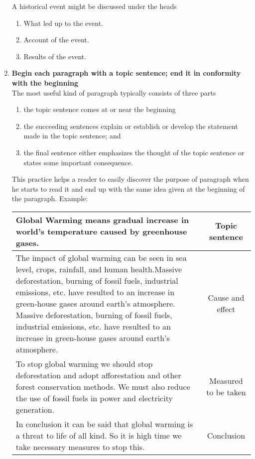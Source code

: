 \documentclass{report}
\begin{document}
\begin{enumerate}
	A historical event might be discussed under the heads
	\begin{enumerate}
		\item What led up to the event.
		\item Account of the event.
		\item Results of the event.
	\end{enumerate}
	
	\item \textbf{Begin each paragraph with a topic sentence; end it in conformity with the beginning}\\
	The most useful kind of paragraph typically consists of three parts 
	\begin{enumerate}
		\item the topic sentence comes at or near the beginning
		\item the succeeding sentences explain or establish or develop the statement made in the topic sentence; and
		\item the final sentence either emphasizes the thought of the topic sentence or states some important consequence.
	\end{enumerate}
This practice helps a reader to easily discover the purpose of paragraph
when he starts to read it and end up with the same idea given at the
beginning of the paragraph.
Example:
	\begin{table}[h]
		\centering
		\begin{tabular}{|p{10cm}|c|}
			\hline
		 Global Warming means gradual increase in world’s temperature caused by greenhouse gases. & Topic sentence\\
		 \hline
 		The impact of global warming can be seen in sea level, crops, rainfall, and human health.Massive deforestation, burning of fossil fuels, industrial emissions, etc. have resulted to an increase in green-house gases around earth’s atmosphere. Massive deforestation, burning of fossil fuels, industrial emissions, etc. have resulted to an increase in green-house gases around earth’s atmosphere. & Cause and effect\\
 		\hline 
 		To stop global warming we should stop deforestation and adopt afforestation and other forest conservation methods.
		 We must also reduce the use of fossil fuels in power and electricity generation.  & Measured to be taken \\
		 \hline
		In conclusion it can be said that global warming is a threat to life of all kind. So it is high time we take necessary measures to stop this. & Conclusion\\
		\hline
		\end{tabular}
	\end{table}
	

\end{enumerate}
\end{document}
